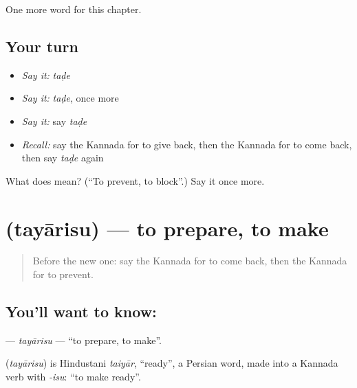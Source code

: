 \begin{grammarlens}[title={What you've built}]
One more word for this chapter.
\end{grammarlens}

\subsection*{Your turn}
\begin{itemize}
\raggedright
  \item \emph{Say it:} \emph{taḍe}
  \item \emph{Say it:} \emph{taḍe}, once more
  \item \emph{Say it:} say \emph{taḍe}
  \item \emph{Recall:} say the Kannada for to give back, then the Kannada for to come back, then say \emph{taḍe} again
\end{itemize}

\begin{tcolorbox}[breakable,colback=teal!4,colframe=teal!35!black,title={Before you move on}]
What does  mean? (\textquotedblleft{}To prevent, to block\textquotedblright{}.) Say it once more.
\end{tcolorbox}
\section[\texorpdfstring{\kn{ತಯಾರಿಸು} (tayārisu)}{ತಯಾರಿಸು (tayārisu)}]{ (tayārisu) — to prepare, to make}

\label{lesson:KA-C278-tayarisu}



\begin{quote}
Before the new one: say the Kannada for to come back, then the Kannada for to prevent.
\end{quote}

\subsection*{You'll want to know: }
\textbf{} — \emph{tayārisu} — \textquotedblleft{}to prepare, to make\textquotedblright{}.

\begin{cousinweb}
\textbf{} (\emph{tayārisu}) is Hindustani \emph{taiyār}, \textquotedblleft{}ready\textquotedblright{}, a Persian word, made into a Kannada verb with \emph{-isu}: \textquotedblleft{}to make ready\textquotedblright{}.
\end{cousinweb}

